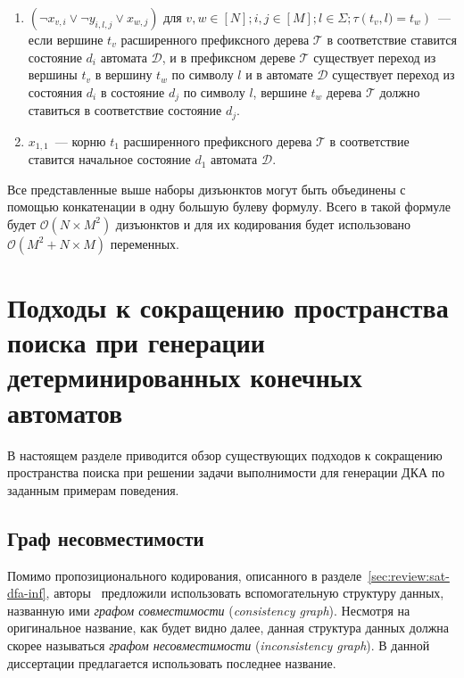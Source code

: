 \begin{enumerate}
  \item $\left(\neg x_{v,i} \vee \neg y_{i,l,j} \vee x_{w,j}\right)$ для $v,w \in \left[N\right]; i,j \in \left[M\right];l \in \Sigma; \tau\left(t_{v},l) = t_{w}\right)$~{---} если вершине $t_{v}$ расширенного префиксного дерева $\mathcal{T} $ в соответствие ставится состояние $d_{i}$ автомата $\mathcal{D}$, и в префиксном дереве $\mathcal{T}$ существует переход из вершины $t_{v}$ в вершину $t_{w}$ по символу $l$ и в автомате $\mathcal{D}$ существует переход из состояния $d_{i}$ в состояние $d_{j}$ по символу $l$, вершине $t_{w}$ дерева $\mathcal{T}$ должно ставиться в соответствие состояние $d_{j}$.
  \item $x_{1,1}$~{---} корню $t_{1}$ расширенного префиксного дерева $\mathcal{T} $ в соответствие ставится начальное состояние $d_{1}$ автомата $\mathcal{D}$.
\end{enumerate}

Все представленные выше наборы дизъюнктов могут быть объединены с помощью конкатенации в одну большую булеву формулу. Всего в такой формуле будет $\mathcal{O}(N \times M^{2})$ дизъюнктов и для их кодирования будет использовано $\mathcal{O}(M^2 + N \times M)$ переменных.


\section{Подходы к сокращению пространства поиска при генерации детерминированных конечных автоматов}
\label{sec:review:sym-breaking}

В настоящем разделе приводится обзор существующих подходов к сокращению пространства поиска при решении задачи выполнимости для генерации ДКА по заданным примерам поведения. 


\subsection{Граф несовместимости}
\label{sec:review:sym-breaking:ig}

Помимо пропозиционального кодирования, описанного в разделе~\ref{sec:review:sat-dfa-inf}, авторы~\cite{heule-icgi10} предложили использовать вспомогательную структуру данных, названную ими \emph{графом совместимости} (\emph{consistency graph}).
Несмотря на оригинальное название, как будет видно далее, данная структура данных должна скорее называться \emph{графом несовместимости} (\emph{inconsistency graph}).
В данной диссертации предлагается использовать последнее название.


